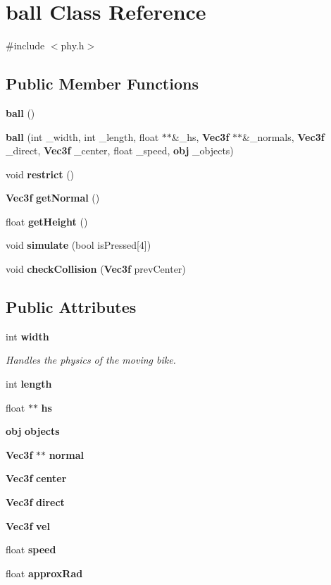 \section{ball Class Reference}
\label{classball}


{\ttfamily \#include $<$phy.\-h$>$}

\subsection*{Public Member Functions}
\begin{DoxyCompactItemize}
\item 
{\bf ball} ()
\item 
{\bf ball} (int \-\_\-width, int \-\_\-length, float $\ast$$\ast$\&\-\_\-hs, {\bf Vec3f} $\ast$$\ast$\&\-\_\-normals, {\bf Vec3f} \-\_\-direct, {\bf Vec3f} \-\_\-center, float \-\_\-speed, {\bf obj} \-\_\-objects)
\item 
void {\bf restrict} ()
\item 
{\bf Vec3f} {\bf get\-Normal} ()
\item 
float {\bf get\-Height} ()
\item 
void {\bf simulate} (bool is\-Pressed[4])
\item 
void {\bf check\-Collision} ({\bf Vec3f} prev\-Center)
\end{DoxyCompactItemize}
\subsection*{Public Attributes}
\begin{DoxyCompactItemize}
\item 
int {\bf width}
\begin{DoxyCompactList}\small\item\em Handles the physics of the moving bike. \end{DoxyCompactList}\item 
int {\bf length}
\item 
float $\ast$$\ast$ {\bf hs}
\item 
{\bf obj} {\bf objects}
\item 
{\bf Vec3f} $\ast$$\ast$ {\bf normal}
\item 
{\bf Vec3f} {\bf center}
\item 
{\bf Vec3f} {\bf direct}
\item 
{\bf Vec3f} {\bf vel}
\item 
float {\bf speed}
\item 
float {\bf approx\-Rad}
\end{DoxyCompactItemize}


